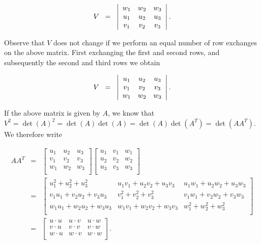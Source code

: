 \documentclass{article}
\begin{document}
\begin{equation*}
V \;\; = \;\; \left | \begin{array}{ccc}
w_1 & w_2 & w_3 \\
u_1 & u_2 & u_3 \\
v_1 & v_2 & v_3 \\
\end{array} \right |. \\
\end{equation*}

\noindent Observe that $V$ does not change if we perform an equal number of row exchanges on the above matrix.  First exchanging the first and second rows, and subsequently the second and third rows we obtain

\begin{equation*}
V \;\; = \;\; \left | \begin{array}{ccc}
u_1 & u_2 & u_3 \\
v_1 & v_2 & v_3 \\
w_1 & w_2 & w_3 \\
\end{array} \right |. \\
\end{equation*}

\noindent If the above matrix is given by $A$, we know that $V^2 = \det(A)^2 = \det(A)\det(A) = \det(A)\det(A^T) = \det(AA^T)$.  We therefore write

\begin{eqnarray*}
AA^T &  = & \left [ \begin{array}{ccc}
u_1 & u_2 & u_3 \\
v_1 & v_2 & v_3 \\
w_1 & w_2 & w_3 \\
\end{array} \right] \left [\begin{array}{ccc}
u_1 & v_1 & w_1 \\
u_2 & v_2 & w_2 \\
u_3 & v_3 & w_3 \\
\end{array} \right ] \\
& = & \left [ \begin{array}{ccc}
u_1^2 + u_2^2 + u_3^2 & u_1v_1 + u_2v_2 + u_3v_3  & u_1w_1 + u_2w_2 + u_3w_3 \\
v_1u_1 + v_2u_2 + v_3u_3 & v_1^2 + v_2^2 + v_3^2 & v_1w_1 + v_2w_2 + v_3w_3 \\
w_1u_1 + w_2u_2 + w_3u_3 & w_1v_1 + w_2v_2 + w_3v_3 & w_1^2 + w_2^2 + w_3^2 \\
\end{array} \right ] \\
& = & \left [ \begin{array}{ccc}
u\cdot u & u\cdot v & u\cdot w \\
v\cdot u & v\cdot v & v\cdot w \\
w\cdot u & w\cdot v & w\cdot w \\
\end{array} \right ]. \\
\end{eqnarray*}
\end{document}
